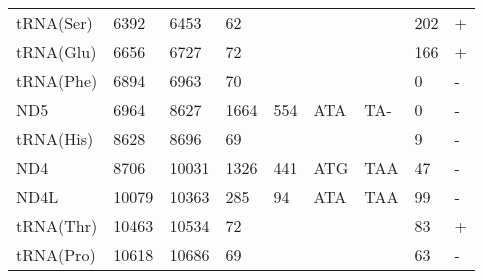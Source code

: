 \documentclass[../DISSERTACAO_MAIN.tex]{subfiles}
\begin{document}
\begin{longtable}{llllllllllllllllllllll}
			tRNA(Ser)    & 6392           & \multicolumn{2}{l}{6453}  & \multicolumn{2}{l}{62}         & \multicolumn{3}{l}{}                          & \multicolumn{3}{l}{}              & \multicolumn{3}{l}{}      & \multicolumn{3}{l}{202}         & \multicolumn{4}{l}{+}                  \\
			tRNA(Glu)    & 6656           & \multicolumn{2}{l}{6727}  & \multicolumn{2}{l}{72}         & \multicolumn{3}{l}{}                          & \multicolumn{3}{l}{}              & \multicolumn{3}{l}{}      & \multicolumn{3}{l}{166}         & \multicolumn{4}{l}{+}                  \\
			tRNA(Phe)    & 6894           & \multicolumn{2}{l}{6963}  & \multicolumn{2}{l}{70}         & \multicolumn{3}{l}{}                          & \multicolumn{3}{l}{}              & \multicolumn{3}{l}{}      & \multicolumn{3}{l}{0}           & \multicolumn{4}{l}{-}                  \\
			ND5          & 6964           & \multicolumn{2}{l}{8627}  & \multicolumn{2}{l}{1664}       & \multicolumn{3}{l}{554}                       & \multicolumn{3}{l}{ATA}           & \multicolumn{3}{l}{TA-}   & \multicolumn{3}{l}{0}           & \multicolumn{4}{l}{-}                  \\
			tRNA(His)    & 8628           & \multicolumn{2}{l}{8696}  & \multicolumn{2}{l}{69}         & \multicolumn{3}{l}{}                          & \multicolumn{3}{l}{}              & \multicolumn{3}{l}{}      & \multicolumn{3}{l}{9}           & \multicolumn{4}{l}{-}                  \\
			ND4          & 8706           & \multicolumn{2}{l}{10031} & \multicolumn{2}{l}{1326}       & \multicolumn{3}{l}{441}                       & \multicolumn{3}{l}{ATG}           & \multicolumn{3}{l}{TAA}   & \multicolumn{3}{l}{47}          & \multicolumn{4}{l}{-}                  \\
			ND4L         & 10079          & \multicolumn{2}{l}{10363} & \multicolumn{2}{l}{285}        & \multicolumn{3}{l}{94}                        & \multicolumn{3}{l}{ATA}           & \multicolumn{3}{l}{TAA}   & \multicolumn{3}{l}{99}          & \multicolumn{4}{l}{-}                  \\
			tRNA(Thr)    & 10463          & \multicolumn{2}{l}{10534} & \multicolumn{2}{l}{72}         & \multicolumn{3}{l}{}                          & \multicolumn{3}{l}{}              & \multicolumn{3}{l}{}      & \multicolumn{3}{l}{83}          & \multicolumn{4}{l}{+}                  \\
			tRNA(Pro)    & 10618          & \multicolumn{2}{l}{10686} & \multicolumn{2}{l}{69}         & \multicolumn{3}{l}{}                          & \multicolumn{3}{l}{}              & \multicolumn{3}{l}{}      & \multicolumn{3}{l}{63}          & \multicolumn{4}{l}{-}                  \\

\end{longtable}
\end{document}

